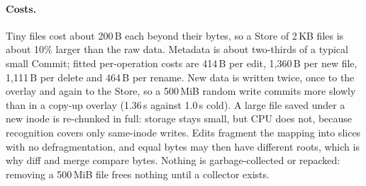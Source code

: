 \paragraph{Costs.} Tiny files cost about 200\,B each beyond their bytes, so a Store of
2\,KB files is about 10\% larger than the raw data. Metadata is about two-thirds of a
typical small Commit; fitted per-operation costs are 414\,B per edit, 1,360\,B per new
file, 1,111\,B per delete and 464\,B per rename. New data is written twice, once to the
overlay and again to the Store, so a 500\,MiB random write commits more slowly than in a
copy-up overlay (1.36\,s against 1.0\,s cold). A large file saved under a new inode is
re-chunked in full: storage stays small, but CPU does not, because recognition covers
only same-inode writes. Edits fragment the mapping into slices with no defragmentation,
and equal bytes may then have different roots, which is why diff and merge compare
bytes. Nothing is garbage-collected or repacked: removing a 500\,MiB file frees nothing
until a collector exists.
